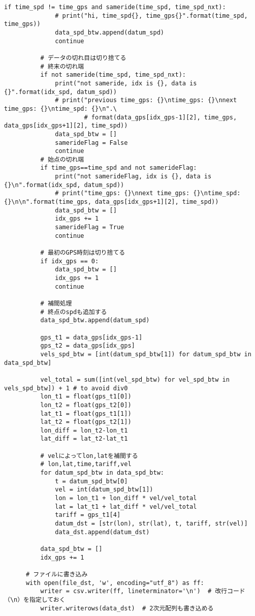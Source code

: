 \documentclass[twocolumn, a4paper, 9pt]{jarticle}
\begin{document}
\begin{lstlisting}[caption=spdgps.py, label=spdgps]
          if time_spd != time_gps and sameride(time_spd, time_spd_nxt):
              # print("hi, time_spd{}, time_gps{}".format(time_spd, time_gps))
              data_spd_btw.append(datum_spd)
              continue
  
          # データの切れ目は切り捨てる
          # 終末の切れ端
          if not sameride(time_spd, time_spd_nxt):
              print("not sameride, idx is {}, data is {}".format(idx_spd, datum_spd))
              # print("previous time_gps: {}\ntime_gps: {}\nnext time_gps: {}\ntime_spd: {}\n".\
                      # format(data_gps[idx_gps-1][2], time_gps, data_gps[idx_gps+1][2], time_spd))            
              data_spd_btw = []
              samerideFlag = False
              continue
          # 始点の切れ端
          if time_gps==time_spd and not samerideFlag:
              print("not samerideFlag, idx is {}, data is {}\n".format(idx_spd, datum_spd))
              # print("time_gps: {}\nnext time_gps: {}\ntime_spd: {}\n\n".format(time_gps, data_gps[idx_gps+1][2], time_spd))
              data_spd_btw = []
              idx_gps += 1
              samerideFlag = True
              continue
  
          # 最初のGPS時刻は切り捨てる
          if idx_gps == 0:
              data_spd_btw = []
              idx_gps += 1
              continue
  
          # 補間処理
          # 終点のspdも追加する
          data_spd_btw.append(datum_spd)
  
          gps_t1 = data_gps[idx_gps-1]
          gps_t2 = data_gps[idx_gps]
          vels_spd_btw = [int(datum_spd_btw[1]) for datum_spd_btw in data_spd_btw]
  
          vel_total = sum([int(vel_spd_btw) for vel_spd_btw in vels_spd_btw]) + 1 # to avoid div0
          lon_t1 = float(gps_t1[0])
          lon_t2 = float(gps_t2[0])
          lat_t1 = float(gps_t1[1])
          lat_t2 = float(gps_t2[1])
          lon_diff = lon_t2-lon_t1
          lat_diff = lat_t2-lat_t1
  
          # velによってlon,latを補間する
          # lon,lat,time,tariff,vel
          for datum_spd_btw in data_spd_btw:
              t = datum_spd_btw[0]
              vel = int(datum_spd_btw[1])
              lon = lon_t1 + lon_diff * vel/vel_total
              lat = lat_t1 + lat_diff * vel/vel_total
              tariff = gps_t1[4]
              datum_dst = [str(lon), str(lat), t, tariff, str(vel)]
              data_dst.append(datum_dst)
  
          data_spd_btw = []
          idx_gps += 1
      
      # ファイルに書き込み
      with open(file_dst, 'w', encoding="utf_8") as ff:
          writer = csv.writer(ff, lineterminator='\n')  # 改行コード（\n）を指定しておく
          writer.writerows(data_dst)  # 2次元配列も書き込める
\end{lstlisting}
\end{document}
